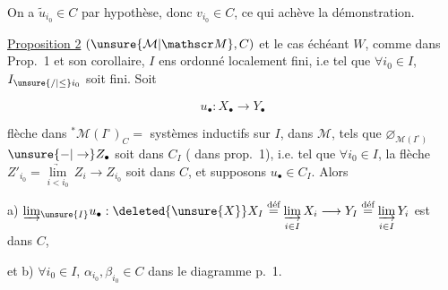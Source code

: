

On a $\widetilde u_{i_0}\in C$ par hypothèse, donc $v_{i_0}\in C$, ce qui achève la démonstration.

\uline{Proposition 2} $(\unsure{\mathcal M|\mathscr M},C)$ et le cas échéant $W$, comme dans Prop.~1 et son corollaire, $I$ ens ordonné localement fini, i.e tel que $\forall i_0\in I$, $I_{\unsure{/|\leq}i_0}$ soit fini. Soit 

\[
 u_\bullet:X_\bullet\longrightarrow Y_\bullet
\]

flèche dans $ {}^{*}\mathcal M(I^\circ)_C={}$ systèmes inductifs sur $I$,  dans $\mathcal M$, tels
 que $\varnothing_{\mathcal M(I^\circ)}$ $\mathbin{\unsure{-|\to}} Z_\bullet$ soit dans $C_I$ ( dans prop.~1), i.e. tel que $\forall i_0\in I$, la flèche $Z'_{i_0}=\underset{i<i_0}{\underrightarrow{\lim}}\,Z_i\longrightarrow Z_{i_0}$ soit dans $C$, et supposons $u_\bullet\in C_I$. Alors

a) $\underrightarrow{\lim}_{\unsure{I}}u_\bullet:\deleted{\unsure{X}}X_I\overset{\text{déf}}{=}\underset{i\in I}{\underrightarrow{\lim}}\,X_i\longrightarrow Y_I\overset{\text{déf}}{=}\underset{i\in I}{\underrightarrow{\lim}}\,Y_i$ est dans $C$,


et b) $\forall i_0\in I$,  $\alpha_{i_0},\beta_{i_0}\in C$ dans le diagramme  p.~1.

